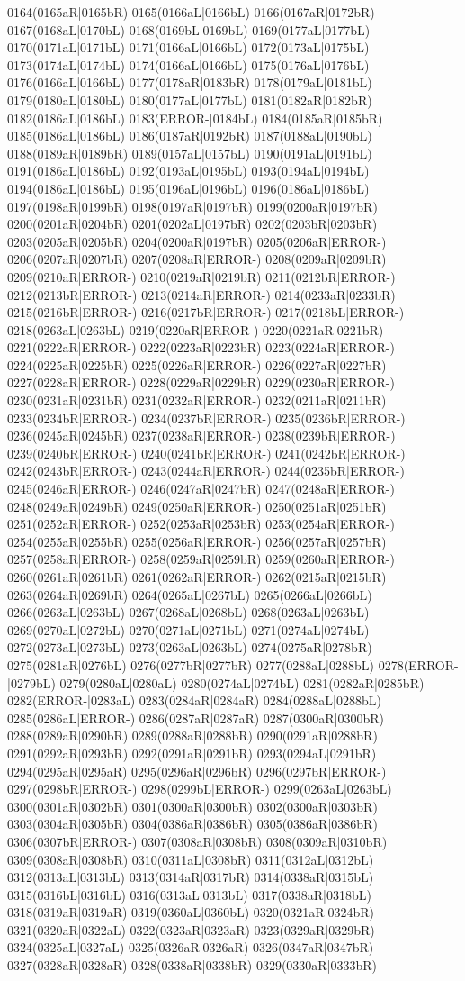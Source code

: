 0164(0165aR|0165bR) 0165(0166aL|0166bL) 0166(0167aR|0172bR) 0167(0168aL|0170bL) 0168(0169bL|0169bL) 0169(0177aL|0177bL) 0170(0171aL|0171bL) 0171(0166aL|0166bL) 0172(0173aL|0175bL) 0173(0174aL|0174bL) 0174(0166aL|0166bL) 0175(0176aL|0176bL) 0176(0166aL|0166bL) 0177(0178aR|0183bR) 0178(0179aL|0181bL) 0179(0180aL|0180bL) 0180(0177aL|0177bL) 0181(0182aR|0182bR) 0182(0186aL|0186bL) 0183(ERROR-|0184bL) 0184(0185aR|0185bR) 0185(0186aL|0186bL) 0186(0187aR|0192bR) 0187(0188aL|0190bL) 0188(0189aR|0189bR) 0189(0157aL|0157bL) 0190(0191aL|0191bL) 0191(0186aL|0186bL) 0192(0193aL|0195bL) 0193(0194aL|0194bL) 0194(0186aL|0186bL) 0195(0196aL|0196bL) 0196(0186aL|0186bL) 0197(0198aR|0199bR) 0198(0197aR|0197bR) 0199(0200aR|0197bR) 0200(0201aR|0204bR) 0201(0202aL|0197bR) 0202(0203bR|0203bR) 0203(0205aR|0205bR) 0204(0200aR|0197bR) 0205(0206aR|ERROR-) 0206(0207aR|0207bR) 0207(0208aR|ERROR-) 0208(0209aR|0209bR) 0209(0210aR|ERROR-) 0210(0219aR|0219bR) 0211(0212bR|ERROR-) 0212(0213bR|ERROR-) 0213(0214aR|ERROR-) 0214(0233aR|0233bR) 0215(0216bR|ERROR-) 0216(0217bR|ERROR-) 0217(0218bL|ERROR-) 0218(0263aL|0263bL) 0219(0220aR|ERROR-) 0220(0221aR|0221bR) 0221(0222aR|ERROR-) 0222(0223aR|0223bR) 0223(0224aR|ERROR-) 0224(0225aR|0225bR) 0225(0226aR|ERROR-) 0226(0227aR|0227bR) 0227(0228aR|ERROR-) 0228(0229aR|0229bR) 0229(0230aR|ERROR-) 0230(0231aR|0231bR) 0231(0232aR|ERROR-) 0232(0211aR|0211bR) 0233(0234bR|ERROR-) 0234(0237bR|ERROR-) 0235(0236bR|ERROR-) 0236(0245aR|0245bR) 0237(0238aR|ERROR-) 0238(0239bR|ERROR-) 0239(0240bR|ERROR-) 0240(0241bR|ERROR-) 0241(0242bR|ERROR-) 0242(0243bR|ERROR-) 0243(0244aR|ERROR-) 0244(0235bR|ERROR-) 0245(0246aR|ERROR-) 0246(0247aR|0247bR) 0247(0248aR|ERROR-) 0248(0249aR|0249bR) 0249(0250aR|ERROR-) 0250(0251aR|0251bR) 0251(0252aR|ERROR-) 0252(0253aR|0253bR) 0253(0254aR|ERROR-) 0254(0255aR|0255bR) 0255(0256aR|ERROR-) 0256(0257aR|0257bR) 0257(0258aR|ERROR-) 0258(0259aR|0259bR) 0259(0260aR|ERROR-) 0260(0261aR|0261bR) 0261(0262aR|ERROR-) 0262(0215aR|0215bR) 0263(0264aR|0269bR) 0264(0265aL|0267bL) 0265(0266aL|0266bL) 0266(0263aL|0263bL) 0267(0268aL|0268bL) 0268(0263aL|0263bL) 0269(0270aL|0272bL) 0270(0271aL|0271bL) 0271(0274aL|0274bL) 0272(0273aL|0273bL) 0273(0263aL|0263bL) 0274(0275aR|0278bR) 0275(0281aR|0276bL) 0276(0277bR|0277bR) 0277(0288aL|0288bL) 0278(ERROR-|0279bL) 0279(0280aL|0280aL) 0280(0274aL|0274bL) 0281(0282aR|0285bR) 0282(ERROR-|0283aL) 0283(0284aR|0284aR) 0284(0288aL|0288bL) 0285(0286aL|ERROR-) 0286(0287aR|0287aR) 0287(0300aR|0300bR) 0288(0289aR|0290bR) 0289(0288aR|0288bR) 0290(0291aR|0288bR) 0291(0292aR|0293bR) 0292(0291aR|0291bR) 0293(0294aL|0291bR) 0294(0295aR|0295aR) 0295(0296aR|0296bR) 0296(0297bR|ERROR-) 0297(0298bR|ERROR-) 0298(0299bL|ERROR-) 0299(0263aL|0263bL) 0300(0301aR|0302bR) 0301(0300aR|0300bR) 0302(0300aR|0303bR) 0303(0304aR|0305bR) 0304(0386aR|0386bR) 0305(0386aR|0386bR) 0306(0307bR|ERROR-) 0307(0308aR|0308bR) 0308(0309aR|0310bR) 0309(0308aR|0308bR) 0310(0311aL|0308bR) 0311(0312aL|0312bL) 0312(0313aL|0313bL) 0313(0314aR|0317bR) 0314(0338aR|0315bL) 0315(0316bL|0316bL) 0316(0313aL|0313bL) 0317(0338aR|0318bL) 0318(0319aR|0319aR) 0319(0360aL|0360bL) 0320(0321aR|0324bR) 0321(0320aR|0322aL) 0322(0323aR|0323aR) 0323(0329aR|0329bR) 0324(0325aL|0327aL) 0325(0326aR|0326aR) 0326(0347aR|0347bR) 0327(0328aR|0328aR) 0328(0338aR|0338bR) 0329(0330aR|0333bR) 